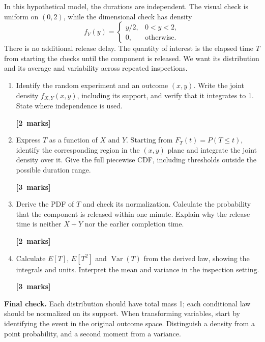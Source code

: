 \documentclass[11pt,a4paper]{article}
\newcommand{\pts}[1]{\par\nobreak\hfill\mbox{\textbf{[#1 marks]}}}
\begin{document}
In this hypothetical model, the durations are independent. The visual check is uniform on $(0,2)$, while the dimensional check has density
\[f_Y(y)=\begin{cases}y/2,&0<y<2,\\0,&\text{otherwise}.\end{cases}\]
There is no additional release delay. The quantity of interest is the elapsed time $T$ from starting the checks until the component is released. We want its distribution and its average and variability across repeated inspections.
\begin{enumerate}
\item Identify the random experiment and an outcome $(x,y)$. Write the joint density $f_{X,Y}(x,y)$, including its support, and verify that it integrates to 1. State where independence is used. \pts{2}
\item Express $T$ as a function of $X$ and $Y$. Starting from $F_T(t)=P(T\le t)$, identify the corresponding region in the $(x,y)$ plane and integrate the joint density over it. Give the full piecewise CDF, including thresholds outside the possible duration range. \pts{3}
\item Derive the PDF of $T$ and check its normalization. Calculate the probability that the component is released within one minute. Explain why the release time is neither $X+Y$ nor the earlier completion time. \pts{2}
\item Calculate $E[T]$, $E[T^2]$ and $\operatorname{Var}(T)$ from the derived law, showing the integrals and units. Interpret the mean and variance in the inspection setting. \pts{3}
\end{enumerate}

\textbf{Final check.} Each distribution should have total mass 1; each conditional law should be normalized on its support. When transforming variables, start by identifying the event in the original outcome space. Distinguish a density from a point probability, and a second moment from a variance.
\end{document}
